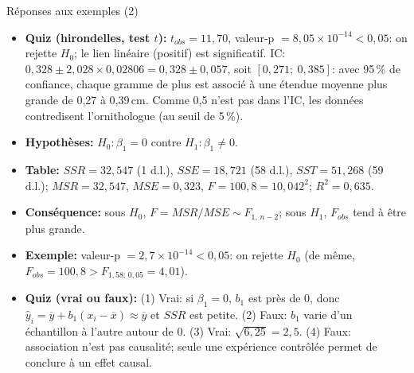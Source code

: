 \documentclass{BeamerTemplate}
\begin{document}
\begin{frame}[t]{Réponses aux exemples (2)}

\scriptsize
\begin{itemize}\itemsep1mm
  \item \textbf{Quiz (hirondelles, test $t$):} $t_{obs}=11{,}70$, valeur-p
  $=8{,}05\times10^{-14}<0{,}05$: on rejette $H_0$; le lien linéaire (positif) est
  significatif. IC: $0{,}328\pm2{,}028\times0{,}02806=0{,}328\pm0{,}057$, soit
  $[0{,}271;\ 0{,}385]$: avec 95\,\% de confiance, chaque gramme de plus est associé à
  une étendue moyenne plus grande de 0,27 à 0,39\,cm. Comme 0,5 n'est pas dans
  l'IC, les données contredisent l'ornithologue (au seuil de 5\,\%).
  \item \textbf{Hypothèses:} $H_0:\beta_1=0$ contre $H_1:\beta_1\ne0$.
  \item \textbf{Table:} $SSR=32{,}547$ (1 d.l.), $SSE=18{,}721$ (58 d.l.),
  $SST=51{,}268$ (59 d.l.); $MSR=32{,}547$, $MSE=0{,}323$, $F=100{,}8=10{,}042^2$;
  $R^2=0{,}635$.
  \item \textbf{Conséquence:} sous $H_0$, $F=MSR/MSE\sim F_{1,\,n-2}$; sous $H_1$,
  $F_{obs}$ tend à être plus grande.
  \item \textbf{Exemple:} valeur-p $=2{,}7\times10^{-14}<0{,}05$: on rejette $H_0$
  (de même, $F_{obs}=100{,}8>F_{1,58;\,0{,}05}=4{,}01$).
  \item \textbf{Quiz (vrai ou faux):} (1) Vrai: si $\beta_1=0$, $b_1$ est près de 0,
  donc $\hat y_i=\overline{y}+b_1(x_i-\overline{x})\approx\overline{y}$ et $SSR$ est
  petite. (2) Faux: $b_1$ varie d'un échantillon à l'autre autour de 0.
  (3) Vrai: $\sqrt{6{,}25}=2{,}5$. (4) Faux: association n'est pas causalité; seule
  une expérience contrôlée permet de conclure à un effet causal.
\end{itemize}

\end{frame}
\end{document}
